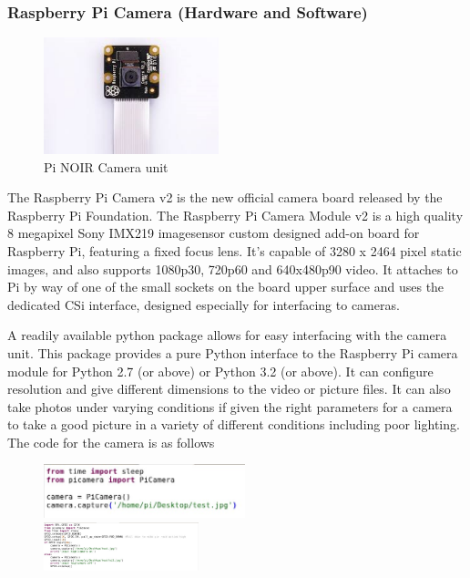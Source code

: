 \subsubsection{Raspberry Pi Camera (Hardware and Software)}
\begin{figure}[h]
	\centering
	\includegraphics[width=2in]{picam.jpg}
	\caption{Pi NOIR Camera unit}
\end{figure}
\par The Raspberry Pi Camera v2 is the new official camera board released by the Raspberry Pi Foundation. The Raspberry Pi Camera Module v2 is a high quality 8 megapixel Sony IMX219 imagesensor custom designed add-on board for Raspberry Pi, featuring a fixed focus lens. It's capable of 3280 x 2464 pixel static images, and also supports 1080p30, 720p60 and 640x480p90 video. It attaches to Pi by way of one of the small sockets on the board upper surface and uses the dedicated CSi interface, designed especially for interfacing to cameras.
\par A readily available python package allows for easy interfacing with the camera unit. This package provides a pure Python interface to the Raspberry Pi camera module for Python 2.7 (or above) or Python 3.2 (or above). It can configure resolution and give different dimensions to the video or picture files. It can also take photos under varying conditions if given the right parameters for a camera to take a good picture in a variety of different conditions including poor lighting. 
The code for the camera is as follows
\begin{figure}[h]
	\includegraphics[width=2.3in]{camcode1.jpg}\\
	\includegraphics[width=0.4\textwidth]{camcode2.jpg}
\end{figure}



